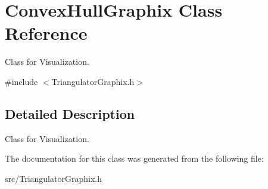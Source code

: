 \hypertarget{classConvexHullGraphix}{}\section{Convex\+Hull\+Graphix Class Reference}
\label{classConvexHullGraphix}


Class for Visualization.  




{\ttfamily \#include $<$Triangulator\+Graphix.\+h$>$}



\subsection{Detailed Description}
Class for Visualization. 

The documentation for this class was generated from the following file\+:\begin{DoxyCompactItemize}
\item 
src/Triangulator\+Graphix.\+h\end{DoxyCompactItemize}
